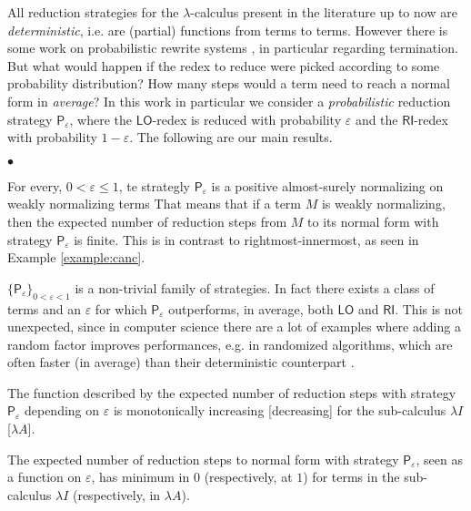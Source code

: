 \documentclass[english]{llncs}
\renewcommand{\labelitemi}{$\bullet$}
\newcommand{\termone}{M}
\newcommand{\pslo}{\mathsf{LO}}
\newcommand{\psri}{\mathsf{RI}}
\newenvironment{varitemize}
{
	\begin{list}{\labelitemi}
		{\setlength{\itemsep}{0pt}
			\setlength{\topsep}{0pt}
			\setlength{\parsep}{0pt}
			\setlength{\partopsep}{0pt}
			\setlength{\leftmargin}{15pt}
			\setlength{\rightmargin}{0pt}
			\setlength{\itemindent}{0pt}
			\setlength{\labelsep}{5pt}
			\setlength{\labelwidth}{10pt}
		}}
		{
		\end{list} 
	}
\begin{document}
All reduction strategies for the $\lambda$-calculus present in the literature up to now are \emph{deterministic}, i.e. are (partial) functions from terms to terms. However there is some work on probabilistic rewrite systems \cite{bournez_proving_2005,ferrer_fioriti_probabilistic_2015,avanzini_probabilistic_2018}, in particular regarding termination. But what would happen if the redex to reduce were picked according to some probability distribution? How many steps would a term need to reach a normal form in \emph{average}? In this work in particular we consider a \emph{probabilistic} reduction strategy $\mathsf{P}_\varepsilon$, where the $\pslo$-redex is reduced with probability $\varepsilon$ and the $\psri$-redex with probability $1-\varepsilon$. The following are our main results.
\begin{varitemize}
	\item
	For every, $0<\varepsilon\leq 1$, te strategly
	$\mathsf{P}_\varepsilon$ is a positive almost-surely normalizing on
	weakly normalizing terms  That means that if a term $\termone$ is
	weakly normalizing, then the expected number of reduction steps from
	$\termone$ to its normal form with strategy $\mathsf{P}_\varepsilon$
	is finite. This is in contrast to rightmost-innermost, as seen in
	Example \ref{example:canc}.
	\item
	$\{\mathsf{P}_\varepsilon\}_{0<\varepsilon<1}$ is a non-trivial
	family of strategies. In fact there exists a class of terms and an
	$\varepsilon$ for which $\mathsf{P}_\varepsilon$ outperforms, in
	average, both $\pslo$ and $\psri$. This is not unexpected, since in
	computer science there are a lot of examples where adding a random
	factor improves performances, e.g. in randomized algorithms, which
	are often faster (in average) than their deterministic counterpart
	\cite{motwani_randomized_1995}.  \ifthenelse
	{}{\item The function described by the
		expected number of reduction steps with strategy
		$\mathsf{P}_\varepsilon$ depending on $\varepsilon$ is
		monotonically increasing [decreasing] for the sub-calculus
		$\lambda I$ [$\lambda A$].}
	\item
	The expected number of reduction steps to
	normal form with strategy $\mathsf{P}_\varepsilon$, seen as a function
	on $\varepsilon$, has minimum in $0$ (respectively, at $1$) for terms
	in the sub-calculus $\lambda I$ (respectively, in $\lambda A$).
\end{varitemize}


\end{document}
